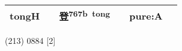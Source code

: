 \documentclass[14pt,a4paper]{scrartcl}
\begin{document}
\begin{longtable}[c]{@{}llllll@{}}
\begin{minipage}[t]{0.14\columnwidth}
tongH
\strut\end{minipage} &
\begin{minipage}[t]{0.14\columnwidth}\raggedright\strut
\strut\end{minipage} &
\begin{minipage}[t]{0.14\columnwidth}\raggedright\strut
登\textsuperscript{767b~tong}
\strut\end{minipage} &
\begin{minipage}[t]{0.14\columnwidth}\raggedright\strut
\strut\end{minipage} &
\begin{minipage}[t]{0.14\columnwidth}\raggedright\strut
pure:A
\strut\end{minipage}\tabularnewline
\bottomrule
\end{longtable}

(213) 0884 {[}2{]}
\end{document}
